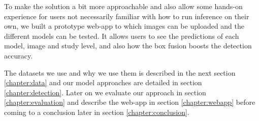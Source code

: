 To make the solution a bit more approachable and also allow some hands-on experience for users not necessarily familiar with how to run inference on their own, we built a prototype web-app to which images can be uploaded and the different models can be tested. It allows users to see the predictions of each model, image and study level, and also how the box fusion boosts the detection accuracy. 

The datasets we use and why we use them is described in the next section \vref{chapter:data} and our model approaches are detailed in section \vref{chapter:detection}. Later on we evaluate our approach in section \vref{chapter:evaluation} and describe the web-app in section \vref{chapter:webapp} before coming to a conclusion later in section \vref{chapter:conclusion}.